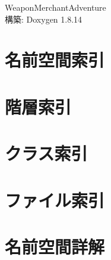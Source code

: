 \documentclass[twoside]{book}
\newcommand{\+}{\discretionary{\mbox{\scriptsize$\hookleftarrow$}}{}{}}
\newcommand{\clearemptydoublepage}{%
  \newpage{\pagestyle{empty}\cleardoublepage}%
}
\begin{document}
\hypersetup{pageanchor=false,
             bookmarksnumbered=true,
             pdfencoding=unicode
            }
\begin{titlepage}
\vspace*{7cm}
\begin{center}%
{\Large Weapon\+Merchant\+Adventure }\\
\vspace*{1cm}
{\large 構築\+: Doxygen 1.8.14}\\
\end{center}
\end{titlepage}
\clearemptydoublepage
{}
\tableofcontents
\clearemptydoublepage
{}
\hypersetup{pageanchor=true}

\chapter{名前空間索引}

\chapter{階層索引}

\chapter{クラス索引}

\chapter{ファイル索引}

\chapter{名前空間詳解}



\end{document}

